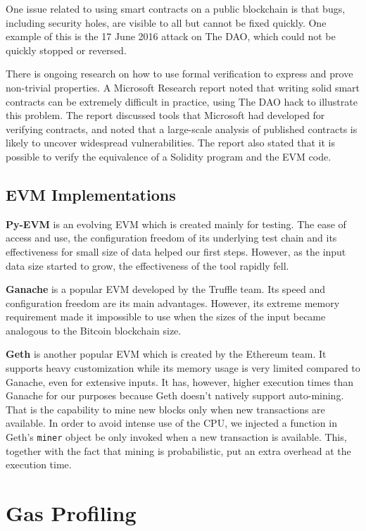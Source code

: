 One issue related to using smart contracts on a public blockchain is that bugs,
including security holes, are visible to all but cannot be fixed quickly.
One example of this is the 17 June 2016 attack on The DAO, which could not be
quickly stopped or reversed.

There is ongoing research on how to use formal verification to express and
prove non-trivial properties. A Microsoft Research report noted that writing
solid smart contracts can be extremely difficult in practice, using The DAO
hack to illustrate this problem. The report discussed tools that Microsoft had
developed for verifying contracts, and noted that a large-scale analysis of
published contracts is likely to uncover widespread vulnerabilities. The report
also stated that it is possible to verify the equivalence of a Solidity program
and the EVM code.

\subsection{EVM Implementations}

\textbf{Py-EVM} is an evolving EVM which is created mainly for testing. The
ease of access and use, the configuration freedom of its underlying test chain
and its effectiveness for small size of data helped our first steps. However,
as the input data size started to grow, the effectiveness of the tool rapidly
fell.

\noindent
\textbf{Ganache} is a popular EVM developed by the Truffle team. Its
speed and configuration freedom are its main advantages. However, its extreme
memory requirement made it impossible to use when the sizes of the input became
analogous to the Bitcoin blockchain size.

\noindent
\textbf{Geth} is another popular EVM which is created by the Ethereum
team. It supports heavy customization while its memory usage is very limited
compared to Ganache, even for extensive inputs. It has, however, higher
execution times than Ganache for our purposes because Geth doesn't natively
support auto-mining. That is the capability to mine new blocks only when new
transactions are available. In order to avoid intense use of the CPU, we
injected a function in Geth's \texttt{miner} object be only invoked when a new
transaction is available. This, together with the fact that mining is
probabilistic, put an extra overhead at the execution time.

\section{Gas Profiling}

